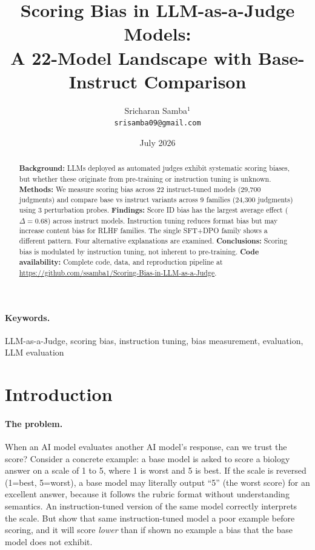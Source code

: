\documentclass[11pt,twocolumn]{article}
\title{Scoring Bias in LLM-as-a-Judge Models:\\A 22-Model Landscape with Base-Instruct Comparison}
\author{Sricharan Samba$^1$ \\ \texttt{srisamba09@gmail.com}}
\date{July 2026}
\begin{document}
\maketitle

\thispagestyle{fancy}


\paragraph{Keywords.} LLM-as-a-Judge, scoring bias, instruction tuning, bias measurement, evaluation, LLM evaluation

\begin{abstract}
\textbf{Background:} LLMs deployed as automated judges exhibit systematic scoring biases, but whether these originate from pre-training or instruction tuning is unknown. \textbf{Methods:} We measure scoring bias across 22 instruct-tuned models (29,700 judgments) and compare base vs instruct variants across 9 families (24,300 judgments) using 3 perturbation probes. \textbf{Findings:} Score ID bias has the largest average effect ($\Delta=0.68$) across instruct models. Instruction tuning reduces format bias but may increase content bias for RLHF families. The single SFT+DPO family shows a different pattern. Four alternative explanations are examined. \textbf{Conclusions:} Scoring bias is modulated by instruction tuning, not inherent to pre-training.
\textbf{Code availability:} Complete code, data, and reproduction pipeline at \url{https://github.com/ssamba1/Scoring-Bias-in-LLM-as-a-Judge}.
\end{abstract}

\section{Introduction}

\paragraph{The problem.}
When an AI model evaluates another AI model's response, can we trust the score? Consider a concrete example: a base model is asked to score a biology answer on a scale of 1 to 5, where 1 is worst and 5 is best. If the scale is reversed (1=best, 5=worst), a base model may literally output ``5'' (the worst score) for an excellent answer, because it follows the rubric format without understanding semantics. An instruction-tuned version of the same model correctly interprets the scale. But show that same instruction-tuned model a poor example before scoring, and it will score \emph{lower} than if shown no example  a bias that the base model does not exhibit.
\end{document}
